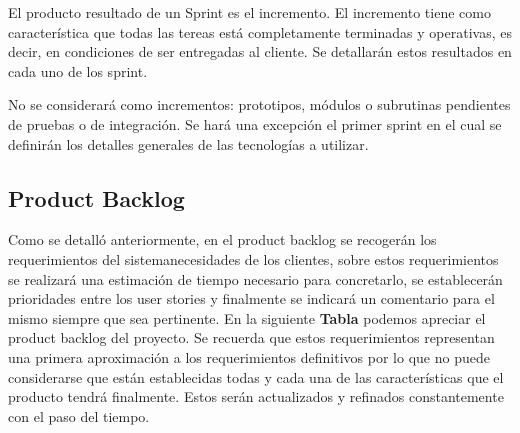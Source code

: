 El producto resultado de un Sprint es el incremento. El incremento tiene como característica que todas las tereas está completamente terminadas y operativas, es decir, en condiciones de ser  entregadas  al cliente. Se detallarán estos resultados en cada uno de los sprint.

No se considerará como incrementos: prototipos, módulos o subrutinas pendientes de pruebas o de integración. Se hará una excepción el primer sprint en el cual se definirán los detalles generales de las tecnologías a utilizar.

\subsection{Product Backlog}

Como se detalló anteriormente, en el product backlog  se recogerán los requerimientos del sistema\/necesidades de los clientes, sobre estos requerimientos se realizará una estimación de tiempo necesario para concretarlo, se establecerán prioridades entre los user stories y finalmente se indicará un comentario para el mismo siempre que sea pertinente. 
En la siguiente \textbf{Tabla} podemos apreciar el product backlog del proyecto.
Se recuerda que estos requerimientos representan una primera aproximación a los requerimientos definitivos por lo que no puede considerarse que están establecidas todas y cada una de las características que el producto tendrá finalmente. Estos serán actualizados y refinados constantemente con el paso del tiempo.


